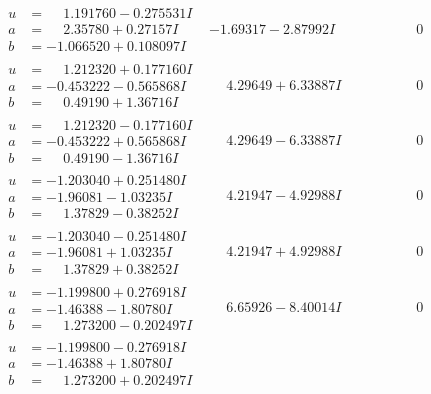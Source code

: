 \documentclass[1p]{elsarticle_modified}
\theoremstyle{definition}
\begin{document}
$$\begin{array}{c|c|c}
\begin{aligned}
u &= \phantom{-}1.191760 - 0.275531 I \\
a &= \phantom{-}2.35780 + 0.27157 I \\
b &= -1.066520 + 0.108097 I\end{aligned}
 & -1.69317 - 2.87992 I & \phantom{-0.000000 } 0 \\ \hline\begin{aligned}
u &= \phantom{-}1.212320 + 0.177160 I \\
a &= -0.453222 - 0.565868 I \\
b &= \phantom{-}0.49190 + 1.36716 I\end{aligned}
 & \phantom{-}4.29649 + 6.33887 I & \phantom{-0.000000 } 0 \\ \hline\begin{aligned}
u &= \phantom{-}1.212320 - 0.177160 I \\
a &= -0.453222 + 0.565868 I \\
b &= \phantom{-}0.49190 - 1.36716 I\end{aligned}
 & \phantom{-}4.29649 - 6.33887 I & \phantom{-0.000000 } 0 \\ \hline\begin{aligned}
u &= -1.203040 + 0.251480 I \\
a &= -1.96081 - 1.03235 I \\
b &= \phantom{-}1.37829 - 0.38252 I\end{aligned}
 & \phantom{-}4.21947 - 4.92988 I & \phantom{-0.000000 } 0 \\ \hline\begin{aligned}
u &= -1.203040 - 0.251480 I \\
a &= -1.96081 + 1.03235 I \\
b &= \phantom{-}1.37829 + 0.38252 I\end{aligned}
 & \phantom{-}4.21947 + 4.92988 I & \phantom{-0.000000 } 0 \\ \hline\begin{aligned}
u &= -1.199800 + 0.276918 I \\
a &= -1.46388 - 1.80780 I \\
b &= \phantom{-}1.273200 - 0.202497 I\end{aligned}
 & \phantom{-}6.65926 - 8.40014 I & \phantom{-0.000000 } 0 \\ \hline\begin{aligned}
u &= -1.199800 - 0.276918 I \\
a &= -1.46388 + 1.80780 I \\
b &= \phantom{-}1.273200 + 0.202497 I\end{aligned}

\end{array}$$
\end{document}
